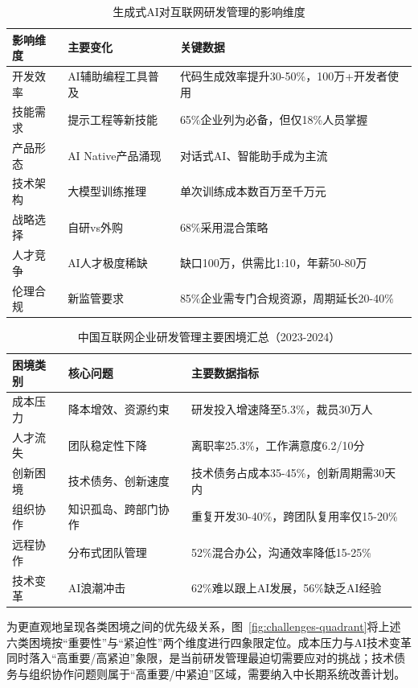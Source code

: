 \begin{table}[htbp]
\centering
\caption{生成式AI对互联网研发管理的影响维度}
\label{tab:ai-impact-summary}
\begin{tabular}{p{2.5cm}p{4.5cm}p{5cm}}
\toprule
\textbf{影响维度} & \textbf{主要变化} & \textbf{关键数据} \\
\midrule
开发效率 & AI辅助编程工具普及 & 代码生成效率提升30-50\%，100万+开发者使用 \\
技能需求 & 提示工程等新技能 & 65\%企业列为必备，但仅18\%人员掌握 \\
产品形态 & AI Native产品涌现 & 对话式AI、智能助手成为主流 \\
技术架构 & 大模型训练推理 & 单次训练成本数百万至千万元 \\
战略选择 & 自研vs外购 & 68\%采用混合策略 \\
人才竞争 & AI人才极度稀缺 & 缺口100万，供需比1:10，年薪50-80万 \\
伦理合规 & 新监管要求 & 85\%企业需专门合规资源，周期延长20-40\% \\
\bottomrule
\end{tabular}
\end{table}

\begin{table}[htbp]
\centering
\caption{中国互联网企业研发管理主要困境汇总（2023-2024）}
\label{tab:challenges-summary}
\begin{tabular}{p{2.5cm}p{4cm}p{5cm}}
\toprule
\textbf{困境类别} & \textbf{核心问题} & \textbf{主要数据指标} \\
\midrule
成本压力 & 降本增效、资源约束 & 研发投入增速降至5.3\%，裁员30万人 \\
人才流失 & 团队稳定性下降 & 离职率25.3\%，工作满意度6.2/10分 \\
创新困境 & 技术债务、创新速度 & 技术债务占成本35-45\%，创新周期需30天内 \\
组织协作 & 知识孤岛、跨部门协作 & 重复开发30-40\%，跨团队复用率仅15-20\% \\
远程协作 & 分布式团队管理 & 52\%混合办公，沟通效率降低15-25\% \\
技术变革 & AI浪潮冲击 & 62\%难以跟上AI发展，56\%缺乏AI经验 \\
\bottomrule
\end{tabular}
\end{table}

为更直观地呈现各类困境之间的优先级关系，图~\ref{fig:challenges-quadrant}将上述六类困境按“重要性”与“紧迫性”两个维度进行四象限定位。成本压力与AI技术变革同时落入“高重要/高紧迫”象限，是当前研发管理最迫切需要应对的挑战；技术债务与组织协作问题则属于“高重要/中紧迫”区域，需要纳入中长期系统改善计划。

